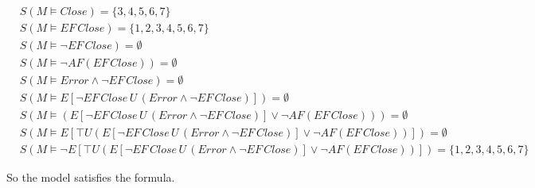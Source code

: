 \documentclass{article}
\begin{document}
\begin{align*}
& S(M \models Close) = \{3, 4, 5, 6, 7\} \\
& S(M \models EF \, Close) = \{1, 2, 3, 4, 5, 6, 7\} \\
& S(M \models \neg EF \, Close) = \emptyset \\
& S(M \models \neg AF(EF \, Close)) = \emptyset \\
& S(M \models Error \wedge \neg EF \, Close) = \emptyset \\
& S(M \models E[\neg EF \, Close \, U \, (Error \wedge \neg EF \, Close)]) = \emptyset \\
& S(M \models (E[\neg EF \, Close \, U \, (Error \wedge \neg EF \, Close)] \vee \neg AF(EF \, Close))) = \emptyset \\
& S(M \models E[\top U (E[\neg EF \, Close \, U \, (Error \wedge \neg EF \, Close)] \vee \neg AF(EF \, Close))]) = \emptyset \\
& S(M \models \neg E[\top U (E[\neg EF \, Close \, U \, (Error \wedge \neg EF \, Close)] \vee \neg AF(EF \, Close))]) = \{1, 2, 3, 4, 5, 6, 7\}
\end{align*}

So the model satisfies the formula.
\end{document}
